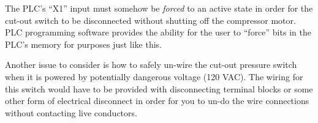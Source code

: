 
The PLC's ``X1'' input must somehow be {\it forced} to an active state in order for the cut-out switch to be disconnected without shutting off the compressor motor.  PLC programming software provides the ability for the user to ``force'' bits in the PLC's memory for purposes just like this.

\vskip 10pt

Another issue to consider is how to safely un-wire the cut-out pressure switch when it is powered by potentially dangerous voltage (120 VAC).  The wiring for this switch would have to be provided with disconnecting terminal blocks or some other form of electrical disconnect in order for you to un-do the wire connections without contacting live conductors.










